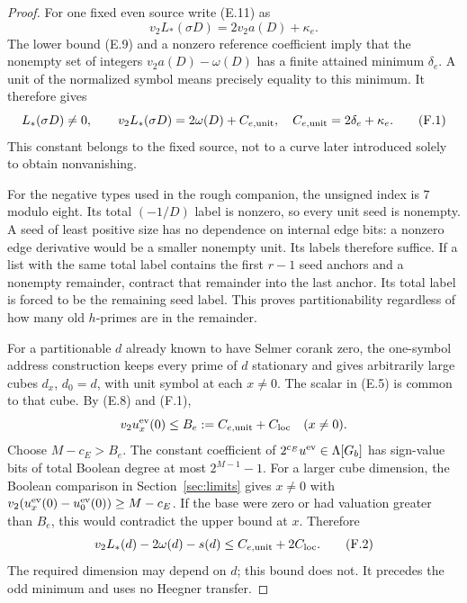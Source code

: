\begin{proof}\leavevmode
For one fixed even source write (E.11) as
\[
             v_2L_*(\sigma D)=2v_2a(D)+\kappa_e.
\]
The lower bound (E.9) and a nonzero reference coefficient imply
that the nonempty set of integers
$v_2a(D)-\omega(D)$ has a finite attained minimum $\delta_e$.
A unit of the normalized symbol means precisely equality to this
minimum. It therefore gives
\[
 L_*(\sigma D)\ne0,\qquad
 v_2L_*(\sigma D)=2\omega(D)+C_{e,\rm unit},
 \quad C_{e,\rm unit}=2\delta_e+\kappa_e.                         \tag{F.1}
\]
This constant belongs to the fixed source, not to a curve later
introduced solely to obtain nonvanishing.

For the negative types used in the rough companion, the unsigned
index is $7$ modulo eight. Its total $(-1/D)$ label is nonzero, so
every unit seed is nonempty. A seed of least positive size has no
dependence on internal edge bits: a nonzero edge derivative
would be a smaller nonempty unit. Its labels therefore suffice.
If a list with the same total label contains the first $r-1$
seed anchors and a nonempty remainder, contract that remainder
into the last anchor. Its total label is forced to be the
remaining seed label. This proves partitionability regardless
of how many old $h$-primes are in the remainder.

For a partitionable $d$ already known to have Selmer corank zero,
the one-symbol address construction keeps every prime of $d$
stationary and gives arbitrarily large cubes $d_x$, $d_0=d$,
with unit symbol at each $x\ne0$. The scalar in (E.5) is common
to that cube. By (E.8) and (F.1),
\[
      v_2u_x^{\rm ev}(0)\le B_e:=C_{e,\rm unit}+C_{\rm loc}
                                      \quad(x\ne0).
\]
Choose $M-c_E>B_e$. The constant coefficient of
$2^{c_E}u^{\rm ev}\in\Lambda[G_b]$ has sign-value bits of total
Boolean degree at most $2^{M-1}-1$. For a larger cube dimension,
the Boolean comparison in Section~\ref{sec:limits} gives
$x\ne0$ with
$v_2(u_x^{\rm ev}(0)-u_0^{\rm ev}(0))\ge M-c_E$.
If the base were zero or had valuation greater than $B_e$, this
would contradict the upper bound at $x$. Therefore
\[
       v_2L_*(d)-2\omega(d)-s(d)
                       \le C_{e,\rm unit}+2C_{\rm loc}.          \tag{F.2}
\]
The required dimension may depend on $d$; this bound does not.
It precedes the odd minimum and uses no Heegner transfer.


\end{proof}

